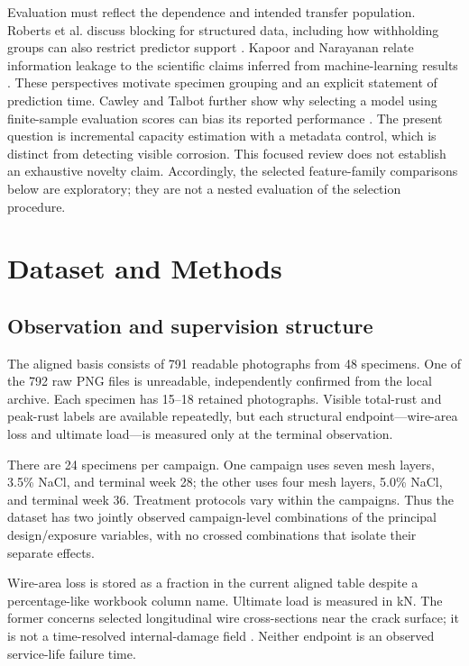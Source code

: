 \documentclass[conference]{IEEEtran}
\begin{document}
Evaluation must reflect the dependence and intended transfer population. Roberts et al. discuss blocking for structured data, including how withholding groups can also restrict predictor support \cite{roberts2017}. Kapoor and Narayanan relate information leakage to the scientific claims inferred from machine-learning results \cite{kapoor2023}. These perspectives motivate specimen grouping and an explicit statement of prediction time. Cawley and Talbot further show why selecting a model using finite-sample evaluation scores can bias its reported performance \cite{cawley2010}. The present question is incremental capacity estimation with a metadata control, which is distinct from detecting visible corrosion. This focused review does not establish an exhaustive novelty claim. Accordingly, the selected feature-family comparisons below are exploratory; they are not a nested evaluation of the selection procedure.

\section{Dataset and Methods}
\subsection{Observation and supervision structure}
The aligned basis consists of 791 readable photographs from 48 specimens. One of the 792 raw PNG files is unreadable, independently confirmed from the local archive. Each specimen has 15--18 retained photographs. Visible total-rust and peak-rust labels are available repeatedly, but each structural endpoint---wire-area loss and ultimate load---is measured only at the terminal observation.

There are 24 specimens per campaign. One campaign uses seven mesh layers, 3.5\% NaCl, and terminal week 28; the other uses four mesh layers, 5.0\% NaCl, and terminal week 36. Treatment protocols vary within the campaigns. Thus the dataset has two jointly observed campaign-level combinations of the principal design/exposure variables, with no crossed combinations that isolate their separate effects.

Wire-area loss is stored as a fraction in the current aligned table despite a percentage-like workbook column name. Ultimate load is measured in kN. The former concerns selected longitudinal wire cross-sections near the crack surface; it is not a time-resolved internal-damage field \cite{hossain_thesis}. Neither endpoint is an observed service-life failure time.
\end{document}
